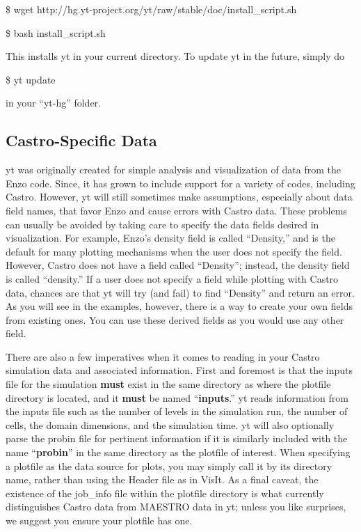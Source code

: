 \$ wget http://hg.yt-project.org/yt/raw/stable/doc/install\_script.sh

\$ bash install\_script.sh

This installs yt in your current directory. To update yt in the future, simply do

\$ yt update

in your ``yt-hg'' folder.

\subsection{Castro-Specific Data}

yt was originally created for simple analysis and visualization of
data from the Enzo code. Since, it has grown to include support for a
variety of codes, including Castro. However, yt will still sometimes
make assumptions, especially about data field names, that favor Enzo
and cause errors with Castro data. These problems can usually be
avoided by taking care to specify the data fields desired in
visualization. For example, Enzo's density field is called
``Density,'' and is the default for many plotting mechanisms when the
user does not specify the field. However, Castro does not have a field
called ``Density''; instead, the density field is called ``density.''
If a user does not specify a field while plotting with Castro data,
chances are that yt will try (and fail) to find ``Density'' and return
an error. As you will see in the examples, however, there is a way to
create your own fields from existing ones. You can use these derived
fields as you would use any other field.

There are also a few imperatives when it comes to reading in your
Castro simulation data and associated information. First and foremost
is that the inputs file for the simulation {\bf must} exist in the
same directory as where the plotfile directory is located, and it {\bf
  must} be named ``{\bf inputs}.'' yt reads information from the
inputs file such as the number of levels in the simulation run, the
number of cells, the domain dimensions, and the simulation time. yt
will also optionally parse the probin file for pertinent information
if it is similarly included with the name ``{\bf probin}'' in the same
directory as the plotfile of interest. When specifying a plotfile as
the data source for plots, you may simply call it by its directory
name, rather than using the Header file as in VisIt. As a final
caveat, the existence of the job\_info file within the plotfile
directory is what currently distinguishes Castro data from MAESTRO
data in yt; unless you like surprises, we suggest you ensure your
plotfile has one.


